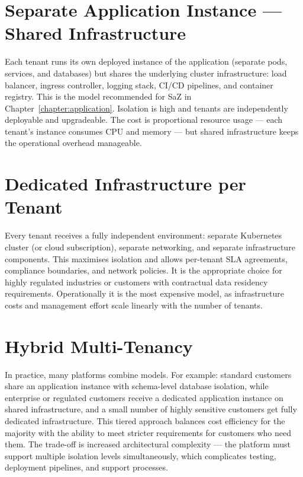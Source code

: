 \section{Separate Application Instance --- Shared Infrastructure}

Each tenant runs its own deployed instance of the application (separate pods, services, and databases) but shares the underlying cluster infrastructure: load balancer, ingress controller, logging stack, CI/CD pipelines, and container registry. This is the model recommended for SaZ in Chapter~\ref{chapter:application}. Isolation is high and tenants are independently deployable and upgradeable. The cost is proportional resource usage --- each tenant's instance consumes CPU and memory --- but shared infrastructure keeps the operational overhead manageable.

\section{Dedicated Infrastructure per Tenant}

Every tenant receives a fully independent environment: separate Kubernetes cluster (or cloud subscription), separate networking, and separate infrastructure components. This maximises isolation and allows per-tenant SLA agreements, compliance boundaries, and network policies. It is the appropriate choice for highly regulated industries or customers with contractual data residency requirements. Operationally it is the most expensive model, as infrastructure costs and management effort scale linearly with the number of tenants.

\section{Hybrid Multi-Tenancy}

In practice, many platforms combine models. For example: standard customers share an application instance with schema-level database isolation, while enterprise or regulated customers receive a dedicated application instance on shared infrastructure, and a small number of highly sensitive customers get fully dedicated infrastructure. This tiered approach balances cost efficiency for the majority with the ability to meet stricter requirements for customers who need them. The trade-off is increased architectural complexity --- the platform must support multiple isolation levels simultaneously, which complicates testing, deployment pipelines, and support processes.

